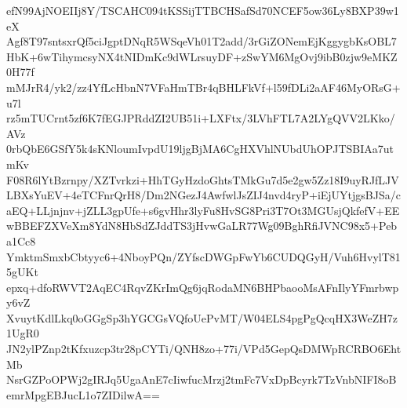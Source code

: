 efN99AjNOEIIj8Y/TSCAHC094tKSSijTTBCHSafSd70NCEF5ow36Ly8BXP39w1eX
Agf8T97sntsxrQf5ciJgptDNqR5WSqeVh01T2add/3rGiZONemEjKggygbKsOBL7
HbK+6wTihymcsyNX4tNIDmKc9dWLrsuyDF+zSwYM6MgOvj9ibB0zjw9eMKZ0H77f
mMJrR4/yk2/zz4YfLcHbnN7VFaHmTBr4qBHLFkVf+l59fDLi2aAF46MyORsG+u7l
rz5mTUCrnt5zf6K7fEGJPRddZI2UB51i+LXFtx/3LVhFTL7A2LYgQVV2LKko/AVz
0rbQbE6GSfY5k4sKNloumIvpdU19ljgBjMA6CgHXVhlNUbdUhOPJTSBIAa7utmKv
F08R6lYtBzrnpy/XZTvrkzi+HhTGyHzdoGhtsTMkGu7d5e2gw5Zz18I9uyRJfLJV
LBXsYuEV+4eTCFnrQrH8/Dm2NGezJ4AwfwlJsZIJ4nvd4ryP+iEjUYtjgsBJSa/c
aEQ+LLjnjnv+jZLL3gpUfe+s6gvHhr3lyFu8HvSG8Pri3T7Ot3MGUsjQkfefV+EE
wBBEFZXVeXm8YdN8HbSdZJddTS3jHvwGaLR77Wg09BghRfiJVNC98x5+Peba1Cc8
YmktmSmxbCbtyyc6+4NboyPQn/ZYfscDWGpFwYb6CUDQGyH/Vuh6HvylT815gUKt
epxq+dfoRWVT2AqEC4RqvZKrImQg6jqRodaMN6BHPbaooMsAFnIlyYFmrbwpy6vZ
XvuytKdlLkq0oGGgSp3hYGCGsVQfoUePvMT/W04ELS4pgPgQcqHX3WeZH7z1UgR0
JN2ylPZnp2tKfxuzcp3tr28pCYTi/QNH8zo+77i/VPd5GepQsDMWpRCRBO6EhtMb
NsrGZPoOPWj2gIRJq5UgaAnE7cIiwfucMrzj2tmFc7VxDpBcyrk7TzVnbNIFI8oB
emrMpgEBJucL1o7ZIDilwA==
